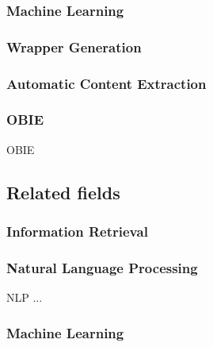 \subsubsection{Machine Learning}

\subsubsection{Wrapper Generation}

\subsubsection{Automatic Content Extraction}

\subsubsection{\acrlong{OBIE}}
\gls{OBIE}

\newpage
\subsection{Related fields}

\subsubsection{Information Retrieval}

\subsubsection{Natural Language Processing}
\gls{NLP} ...

\subsubsection{Machine Learning}
